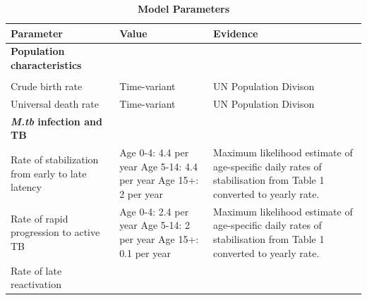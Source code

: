 \documentclass{article}
\begin{document}
\begin{table}[!htp]
    \caption{\textbf{Model Parameters}}
    \label{tab:parameter}
    \begin{tabularx}{\textwidth}{ X  X  X }
        \hline
        \textbf{Parameter} & \textbf{Value} & \textbf{Evidence} \\
        \hline
        \textbf{Population characteristics} & & \\
         \\
        Crude birth rate  & Time-variant & UN Population Divison \\
        Universal death rate & Time-variant & UN Population Divison \\
        \hline
        \textbf{\emph{M.tb} infection and TB} \\
        Rate of stabilization from early to late latency &    
        \begin{minipage}[t]{0.3\textwidth}
            Age 0-4: 4.4 per year \newline
            Age 5-14: 4.4 per year \newline
            Age 15+: 2 per year \newline
        \end{minipage}
        & 
        \begin{minipage}[t]{0.3\textwidth}
            Maximum likelihood estimate of age-specific daily rates of stabilisation from Table 1 converted to yearly rate. \cite{ragonnet-2017}
        \end{minipage} \\
        Rate of rapid progression to active TB & 
        \begin{minipage}[t]{0.3\textwidth}
            Age 0-4: 2.4 per year \newline
            Age 5-14: 2 per year \newline
            Age 15+: 0.1 per year \newline
        \end{minipage}
        & 
        \begin{minipage}[t]{0.3\textwidth}
            Maximum likelihood estimate of age-specific daily rates of stabilisation from Table 1 converted to yearly rate. \cite{ragonnet-2017}
        \end{minipage}  \\
        Rate of late reactivation & 
        \begin{minipage}[t]{0.3\textwidth}

\end{minipage}
\end{tabularx}
\end{table}
\end{document}
